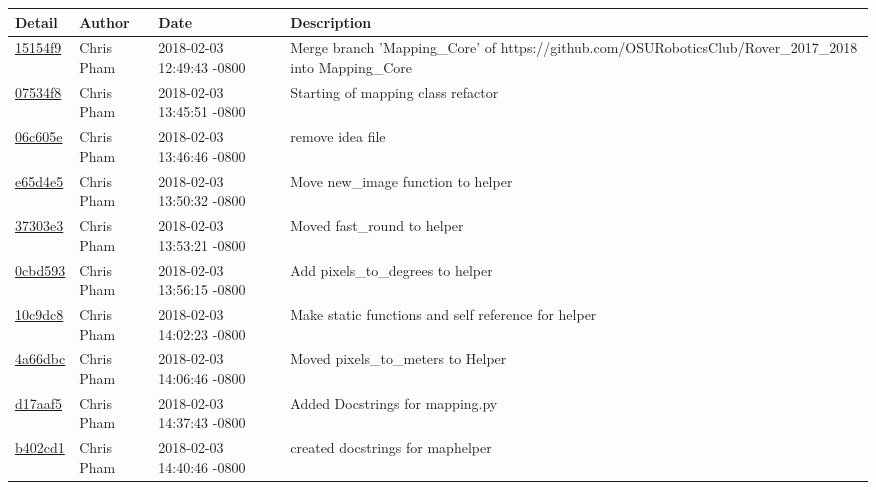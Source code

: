 \begin{center}
\begin{tabular}{l l l l}\textbf{Detail} & \textbf{Author} & \textbf{Date} & \textbf{Description}\\\hline
\href{https://github.com/OSURoboticsClub/Rover_2017_2018/commit/15154f912ff4204e8a3bcf48299592d1fb8bc2ca}{15154f9} & Chris Pham & 2018-02-03 12:49:43 -0800 &Merge branch 'Mapping\_Core' of https://github.com/OSURoboticsClub/Rover\_2017\_2018 into Mapping\_Core\\\hline
\href{https://github.com/OSURoboticsClub/Rover_2017_2018/commit/07534f8487ba8a04d63e73c22385158479c3c6cc}{07534f8} & Chris Pham & 2018-02-03 13:45:51 -0800 &Starting of mapping class refactor\\\hline
\href{https://github.com/OSURoboticsClub/Rover_2017_2018/commit/06c605ebd5780e65f1f7ad077ef5cf7a136d2a18}{06c605e} & Chris Pham & 2018-02-03 13:46:46 -0800 &remove idea file\\\hline
\href{https://github.com/OSURoboticsClub/Rover_2017_2018/commit/e65d4e5067d4b3f9b1223a57f7666131e2c2cf6f}{e65d4e5} & Chris Pham & 2018-02-03 13:50:32 -0800 &Move new\_image function to helper\\\hline
\href{https://github.com/OSURoboticsClub/Rover_2017_2018/commit/37303e3a95020e41aadea474e2d6e95c543f5af0}{37303e3} & Chris Pham & 2018-02-03 13:53:21 -0800 &Moved fast\_round to helper\\\hline
\href{https://github.com/OSURoboticsClub/Rover_2017_2018/commit/0cbd593380d86ca3d479b7e40167273641c8c04d}{0cbd593} & Chris Pham & 2018-02-03 13:56:15 -0800 &Add pixels\_to\_degrees to helper\\\hline
\href{https://github.com/OSURoboticsClub/Rover_2017_2018/commit/10c9dc8451a582e67e8475e2bf161054191f1d02}{10c9dc8} & Chris Pham & 2018-02-03 14:02:23 -0800 &Make static functions and self reference for helper\\\hline
\href{https://github.com/OSURoboticsClub/Rover_2017_2018/commit/4a66dbc0b5954672d4377a1c9e07c53ccd1d7323}{4a66dbc} & Chris Pham & 2018-02-03 14:06:46 -0800 &Moved pixels\_to\_meters to Helper\\\hline
\href{https://github.com/OSURoboticsClub/Rover_2017_2018/commit/d17aaf5ef8343be017032c46fa391b9b27470bc2}{d17aaf5} & Chris Pham & 2018-02-03 14:37:43 -0800 &Added Docstrings for mapping.py\\\hline
\href{https://github.com/OSURoboticsClub/Rover_2017_2018/commit/b402cd12d3ab294d280cddf85c28ac263f62ce91}{b402cd1} & Chris Pham & 2018-02-03 14:40:46 -0800 &created docstrings for maphelper\\\hline

\end{tabular}
\end{center}
